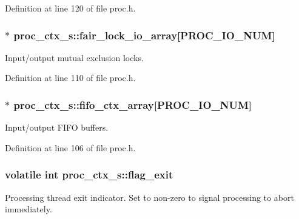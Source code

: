 Definition at line 120 of file proc.\+h.

\subsubsection[{\texorpdfstring{fair\+\_\+lock\+\_\+io\+\_\+array}{fair_lock_io_array}}]{$\ast$ proc\+\_\+ctx\+\_\+s\+::fair\+\_\+lock\+\_\+io\+\_\+array\mbox{[}P\+R\+O\+C\+\_\+\+I\+O\+\_\+\+N\+UM\mbox{]}}\hypertarget{structproc__ctx__s_a6529e1ba97566c429d658e121bb604bb}{}\label{structproc__ctx__s_a6529e1ba97566c429d658e121bb604bb}
Input/output mutual exclusion locks. 

Definition at line 110 of file proc.\+h.

\subsubsection[{\texorpdfstring{fifo\+\_\+ctx\+\_\+array}{fifo_ctx_array}}]{$\ast$ proc\+\_\+ctx\+\_\+s\+::fifo\+\_\+ctx\+\_\+array\mbox{[}P\+R\+O\+C\+\_\+\+I\+O\+\_\+\+N\+UM\mbox{]}}\hypertarget{structproc__ctx__s_a3b71d039235f439a87d9ec7d7b5b5549}{}\label{structproc__ctx__s_a3b71d039235f439a87d9ec7d7b5b5549}
Input/output F\+I\+FO buffers. 

Definition at line 106 of file proc.\+h.

\subsubsection[{\texorpdfstring{flag\+\_\+exit}{flag_exit}}]{\setlength{\rightskip}{0pt plus 5cm}volatile int proc\+\_\+ctx\+\_\+s\+::flag\+\_\+exit}\hypertarget{structproc__ctx__s_a86a21b28f6c41f7a9a4cc9586f782d68}{}\label{structproc__ctx__s_a86a21b28f6c41f7a9a4cc9586f782d68}
Processing thread exit indicator. Set to non-\/zero to signal processing to abort immediately. 

